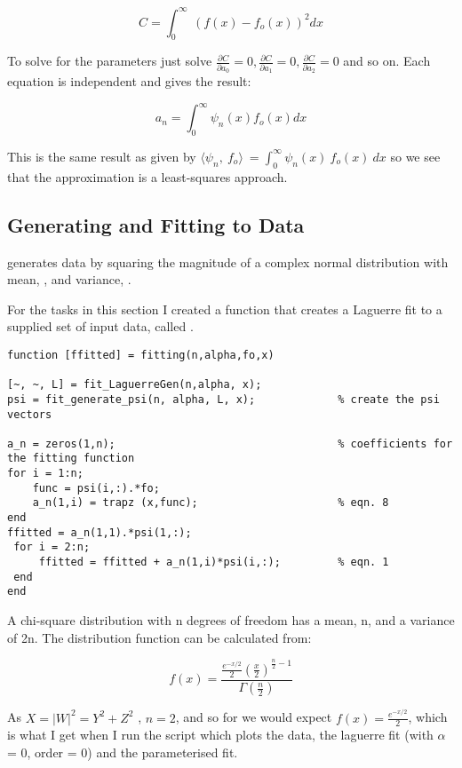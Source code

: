 \documentclass{article}
\begin{document}
\begin{equation}
C = \int_0^\infty \ ( f(x) - f_o(x))^2 dx 
\end{equation}


To solve for the parameters just solve $\frac{\partial C}{\partial a_0} = 0, \frac{\partial C}{\partial a_1} = 0, \frac{\partial C}{\partial a_2} = 0$ and so on. Each equation is independent and gives the result:

\begin{equation}
a_n = \int_0^\infty \psi_n (x) f_o (x)dx
\end{equation}

This is the same result as given by $\langle \psi_n, \ f_o \rangle\ = \int_0^{\infty}\psi_n(x) \ f_o(x) \ dx $ so we see that the approximation is a least-squares approach.

\subsection{Generating and Fitting to Data}

 generates data by squaring the magnitude of a complex normal distribution with mean, , and variance, .


For the tasks in this section I created a function that creates a Laguerre fit to a supplied set of input data, called .

\begin{lstlisting}
function [ffitted] = fitting(n,alpha,fo,x)

[~, ~, L] = fit_LaguerreGen(n,alpha, x);
psi = fit_generate_psi(n, alpha, L, x);             % create the psi vectors

a_n = zeros(1,n);      		                        % coefficients for the fitting function
for i = 1:n;
    func = psi(i,:).*fo;
    a_n(1,i) = trapz (x,func);   	                % eqn. 8
end
ffitted = a_n(1,1).*psi(1,:);
 for i = 2:n;
     ffitted = ffitted + a_n(1,i)*psi(i,:);         % eqn. 1
 end
end
\end{lstlisting}

A chi-square distribution with n degrees of freedom has a mean, n, and a variance of 2n. The distribution function can be calculated from:

\begin{equation}
f(x) = \frac{\frac{e^{-x/2}}{2} ( \frac{x}{2}) ^ { \frac{n}{2} -1}}{\Gamma(\frac{n}{2})}
\end{equation}


As $ X = |W|^{2} = Y^{2} + Z^{2} $ , $n = 2$, and so for  we would expect $f(x) = \frac{e^{-x/2}}{2}$, which is what I get when I run the script  which plots the data, the laguerre fit (with $\alpha$ = 0, order = 0) and the parameterised fit.
\end{document}
